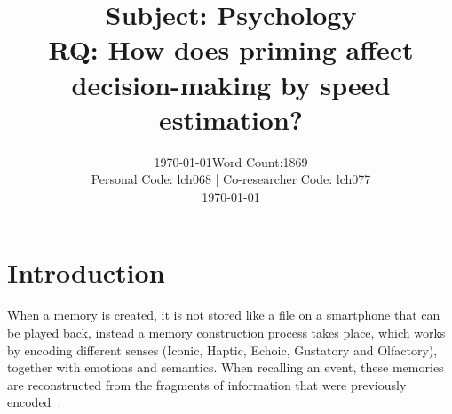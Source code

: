 \documentclass[11pt]{article}
\title{\textbf{Subject: Psychology} \\[1ex]\large RQ: How does priming affect decision-making by speed estimation?}
\author{}
\date{\today}
\begin{document}
\date{Word Count:1869\\Personal Code: lch068  | Co-researcher Code: lch077  \\ \today }
\maketitle
\newpage
\tableofcontents

\section{Introduction}
When a memory is created, it is not stored like a file on a smartphone that can be played back, instead a memory construction process takes place, which works by encoding different senses (Iconic, Haptic, Echoic, Gustatory and Olfactory), together with emotions and semantics.
When recalling an event, these memories are reconstructed from the fragments of information that were previously encoded~\autocite{Stark2010}.
\end{document}
